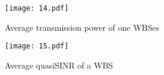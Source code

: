 \begin{figure}[h!]
  \centering
  \texttt{[image: 14.pdf]}
  \caption{Average transmission power of one WBSes}
\label{CAPA_power}
\end{figure}


\begin{figure}[h!]
  \centering
  \texttt{[image: 15.pdf]}
  \caption{Average quasiSINR of a WBS}
\label{CAPA_quasiSINR}
\end{figure}








